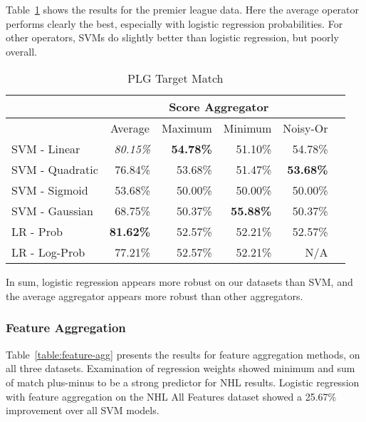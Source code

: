 \documentclass[conference]{IEEEtran}
\begin{document}
Table~\ref{table:score-plg} shows the results for the premier league data. Here the average operator performs clearly the best, especially with logistic regression probabilities. For other operators, SVMs do slightly better than logistic regression, but poorly overall.

\begin{table}[t]
\caption{PLG Target Match}
\centering
\begin{tabular}{|l|r|r|r|r|r|}
\hline
 & \multicolumn{4}{c|}{Score Aggregator}\\ \hline
 & \multicolumn{ 1}{c|}{Average} & \multicolumn{ 1}{c|}{Maximum} & \multicolumn{1}{c|}{Minimum} &
\multicolumn{ 1}{c|}{Noisy-Or}  \\\hline \cline{ 1- 1}
SVM - Linear & \textit{80.15\%} & \textbf{54.78\%} & 51.10\% & 54.78\% \\ \hline
SVM - Quadratic & 76.84\% & 53.68\% & 51.47\% & \textbf{53.68\%} \\ \hline
SVM - Sigmoid & 53.68\% & 50.00\% & 50.00\% & 50.00\% \\ \hline
SVM - Gaussian & 68.75\% & 50.37\% & \textbf{55.88\%} & 50.37\% \\ \hline
LR - Prob & \textbf{81.62\%} & 52.57\% & 52.21\% & 52.57\% \\ \hline
LR - Log-Prob & 77.21\% & 52.57\% & 52.21\% & N/A \\ \hline
\end{tabular}
\label{table:score-plg}
\end{table}%


In sum, logistic regression appears more robust on our datasets than SVM, and the average aggregator appears more robust than other aggregators.

\subsubsection{Feature Aggregation}

Table~\ref{table:feature-agg} presents the results for feature aggregation methods, on all three datasets. Examination of regression weights showed minimum and sum of match plus-minus to be a strong predictor for NHL results. Logistic regression with feature aggregation on the NHL All Features dataset showed a 25.67\% improvement over all SVM models.
\end{document}
